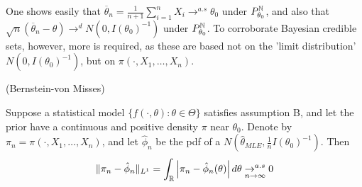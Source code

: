 \documentclass[a4paper]{article}
\begin{document}
One shows easily that $\overline{\theta}_n = \frac{1}{n+1} \sum_{i=1}^{n} X_i \to^{a.s} \theta_0 $ under $P_{\theta_0}^{\mathbb{N}}$, and also that $\sqrt{n}(\overline{\theta}_n - \theta) \to ^{d} N(0, I(\theta_0)^{-1})$ under $P_{\theta_0}^{\mathbb{N}}$. To corroborate Bayesian credible sets, however, more is required, as these are based not on the 'limit distribution' $N(0, I(\theta_0)^{-1})$, but on $\pi(\cdot , X_1, \ldots, X_n)$.

\begin{thm}(Bernstein-von Misses)
	
	Suppose a statistical model $\{f\left( \cdot , \theta \right) : \theta \in \Theta \}$ satisfies assumption B, and let the prior have a continuous and positive density $\pi$ near $\theta_0$. Denote by $\pi_n = \pi(\cdot , X_1, \ldots, X_n)$, and let $\hat{\phi}_n$ be the pdf of a $N(\hat{\theta}_{MLE}, \frac{1}{n}I(\theta_0)^{-1})$. Then
	\[
		\|\pi_n - \hat{\phi}_n\|_{L^{1}} = \int_{\mathbb{R}} \left|\pi_n - \hat{\phi}_n(\theta)\right|d\theta \underset{n\to \infty}{\to ^{a.s}} 0
	\] 
\end{thm}
\end{document}
